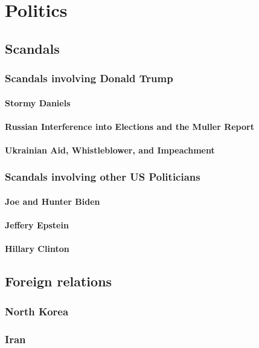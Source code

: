 		
	\section{Politics}
		\subsection{Scandals}
			\subsubsection{Scandals involving Donald Trump}
				\paragraph{Stormy Daniels}
				\paragraph{Russian Interference into Elections and the Muller Report}
				\paragraph{Ukrainian Aid, Whistleblower, and Impeachment}
				
			\subsubsection{Scandals involving other US Politicians}
				\paragraph{Joe and Hunter Biden}
				\paragraph{Jeffery Epstein}
				\paragraph{Hillary Clinton}

				


		\subsection{Foreign relations}	
			\subsubsection{North Korea}
			\subsubsection{Iran}
